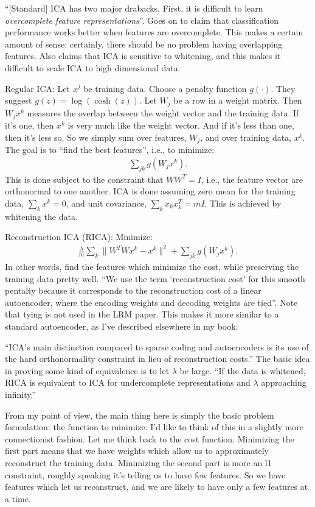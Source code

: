 \documentclass[12pt]{report}
\begin{document}
``[Standard] ICA has two major drabacks.  First, it is difficult to
learn \emph{overcomplete feature representations}''.  Goes on to claim
that classification performance works better when features are
overcomplete.  This makes a certain amount of sense: certainly, there
should be no problem having overlapping features.  Also claims that
ICA is sensitive to whitening, and this makes it difficult to scale
ICA to high dimensional data.

Regular ICA: Let $x^j$ be training data.  Choose a penalty function
$g(\cdot)$.  They suggest $g(z) = \log(\cosh(z))$.  Let $W_j$ be a row
in a weight matrix.  Then $W_j x^k$ measures the overlap between the
weight vector and the training data.  If it's one, then $x^k$ is very
much like the weight vector.  And if it's less than one, then it's
less so.  So we simply sum over features, $W_j$, and over training
data, $x^k$.  The goal is to ``find the best features'', i.e., to
minimize:
\begin{eqnarray}
  \sum_{jk} g(W_j x^k).
\end{eqnarray}
This is done subject to the constraint that $WW^T = I$, i.e., the
feature vector are orthonormal to one another.  ICA is done assuming
zero mean for the training data, $\sum_k x^k = 0$, and unit
covariance, $\sum_k x_k x_k^T = m I$.  This is achieved by whitening
the data.

Reconstruction ICA (RICA): Minimize:
\begin{eqnarray}
  \frac{\lambda}{m} \sum_k \| W^T W x^k - x^k\|^2 + \sum_{jk} g(W_j x^k).
\end{eqnarray}
In other words, find the features which minimize the cost, while
preserving the training data pretty well.  ``We use the term
`reconstruction cost' for this smooth pentalty because it corresponds
to the reconstruction cost of a linear autoencoder, where the encoding
weights and decoding weights are tied''.  Note that tying is not used
in the LRM paper.  This makes it more similar to a standard
autoencoder, as I've described elsewhere in my book.

``ICA's main distinction compared to sparse coding and autoencoders is
its use of the hard orthonormality constraint in lieu of
reconstruction costs.''  The basic idea in proving some kind of
equivalence is to let $\lambda$ be large.  ``If the data is whitened,
RICA is equivalent to ICA for undercomplete representations and
$\lambda$ approaching infinity.''

From my point of view, the main thing here is simply the basic problem
formulation: the function to minimize.  I'd like to think of this in a
slightly more connectionist fashion.  Let me think back to the cost
function.  Minimizing the first part means that we have weights which
allow us to approximately reconstruct the training data.  Minimizing
the second part is more an l1 constraint, roughly speaking it's
telling us to have few features.  So we have features which let us
reconstruct, and we are likely to have only a few features at a time.
\end{document}
